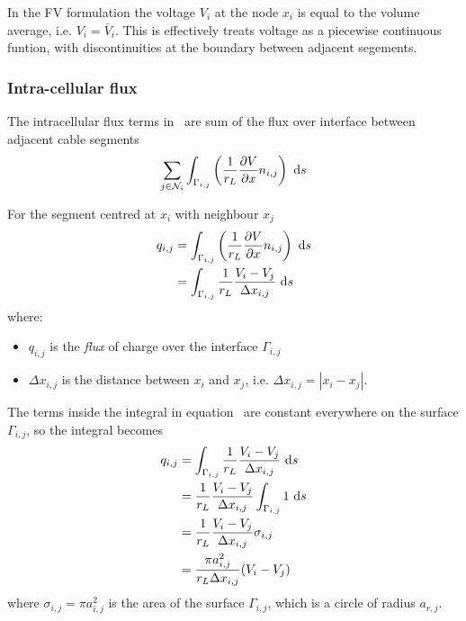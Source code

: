 In the FV formulation the voltage $V_i$ at the node $x_i$ is equal to the volume average, i.e. $V_i=\bar{V}_i$.
This is effectively treats voltage as a piecewise continuous funtion, with discontinuities at the boundary between adjacent segements.

\subsubsection{Intra-cellular flux}
The intracellular flux terms in~ are sum of the flux over interface between adjacent cable segments
\begin{equation}
    \sum_{j\in\mathcal{N}_i} {\int_{\Gamma_{i,j}}  \left( \frac{1}{r_L}\frac{\partial{V}}{\partial{x}} n_{i,j} \right) ~\text{d}{s} }
\end{equation}

For the segment centred at $x_i$ with neighbour $x_j$
\begin{align}
    q_{i,j} &= \int_{\Gamma_{i,j}}  \left( \frac{1}{r_L}\frac{\partial{V}}{\partial{x}} n_{i,j} \right) ~\text{d}{s} \nonumber \\
            &= \int_{\Gamma_{i,j}}  \frac{1}{r_L}\frac{V_i-V_j}{\Delta x_{i,j}} ~\text{d}{s}
          \label{eq:q_ij_intermediate}
\end{align}
where:
\begin{itemize}
    \item $q_{i,j}$ is the \emph{flux} of charge over the interface $\Gamma_{i,j}$
    \item $\Delta x_{i,j}$ is the distance between $x_i$ and $x_j$, i.e. $\Delta x_{i,j}=|x_i-x_j|$.
\end{itemize}

The terms inside the integral in equation~ are constant everywhere on the surface $\Gamma_{i,j}$, so the integral becomes
\begin{align}
  q_{i,j} &= \int_{\Gamma_{i,j}}  \frac{1}{r_L}\frac{V_i-V_j}{\Delta x_{i,j}} ~\text{d}{s} \nonumber \\
          &= \frac{1}{r_L}\frac{V_i-V_j}{\Delta x_{i,j}} \int_{\Gamma_{i,j}} 1 ~\text{d}{s} \nonumber \\
          &= \frac{1}{r_L}\frac{V_i-V_j}{\Delta x_{i,j}} \sigma_{i,j} \nonumber \\
          &= \frac{\pi a_{i,j}^2}{r_L \Delta x_{i,j}} (V_i-V_j)
          \label{eq:q_ij}
\end{align}
where $\sigma_{i,j}=\pi a_{i,j}^2$ is the area of the surface $\Gamma_{i,j}$, which is a circle of radius $a_{r,j}$.

